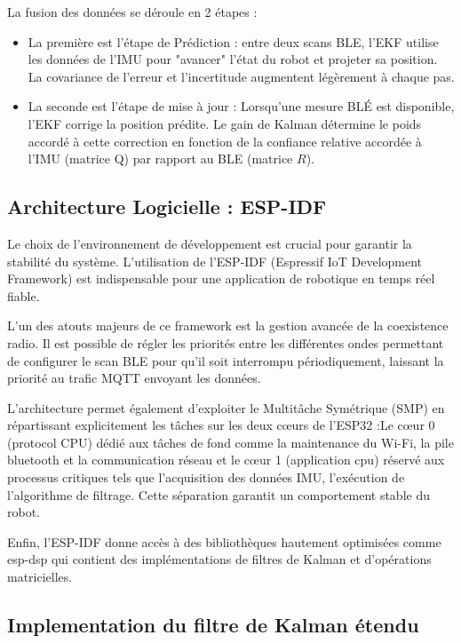 \documentclass[11pt, a4paper]{article}
\begin{document}
La fusion des données se déroule en 2 étapes :
\begin{itemize}
	\item La première est l’étape de Prédiction :  entre deux scans BLE, l'EKF utilise les données de l'IMU pour "avancer" l'état du robot et projeter sa position. La covariance de l'erreur et l’incertitude augmentent légèrement à chaque pas.
	\item La seconde est l’étape de mise à jour : Lorsqu'une mesure BLÉ est disponible, l'EKF corrige la position prédite. Le gain de Kalman détermine le poids accordé à cette correction en fonction de la confiance relative accordée à l'IMU (matrice Q) par rapport au BLE (matrice $R$).

\end{itemize}

\subsection{Architecture Logicielle : ESP-IDF}

Le choix de l'environnement de développement est crucial pour garantir la stabilité du système. L'utilisation de l'ESP-IDF (Espressif IoT Development Framework) est indispensable pour une application de robotique en temps réel fiable.

L'un des atouts majeurs de ce framework est la gestion avancée de la coexistence radio. Il est possible de régler les priorités entre les différentes ondes permettant de configurer le scan BLE pour qu'il soit interrompu périodiquement, laissant la priorité au trafic MQTT envoyant les données.

L'architecture permet également d'exploiter le Multitâche Symétrique (SMP) en répartissant explicitement les tâches sur les deux cœurs de l'ESP32 :Le cœur 0 (protocol CPU) dédié aux tâches de fond comme la maintenance du Wi-Fi, la pile bluetooth et la communication réseau et le cœur 1 (application cpu) réservé aux processus critiques tels que l’acquisition des données IMU, l’exécution de l’algorithme de filtrage. Cette séparation garantit un comportement stable du robot.

Enfin, l'ESP-IDF donne accès à des bibliothèques hautement optimisées comme esp-dsp qui contient des implémentations de filtres de Kalman et d'opérations matricielles.

\subsection{Implementation du filtre de Kalman étendu}
\end{document}
